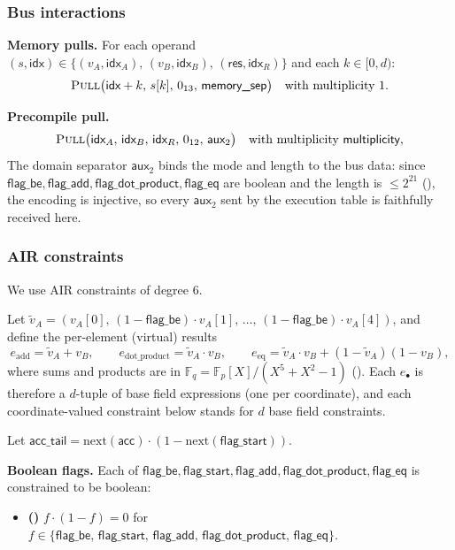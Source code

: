 \documentclass{article}
\theoremstyle{definition}
\newcommand{\Fp}{\mathbb F_p}
\newcommand{\Fq}{\mathbb F_q}
\newcommand{\extdeg}{d} %
\begin{document}
\subsubsection{Bus interactions}

\textbf{Memory pulls.} For each operand $(s, \textsf{idx}) \in \{(v_A, \textsf{idx}_A),\, (v_B, \textsf{idx}_B),\, (\textsf{res}, \textsf{idx}_R)\}$ and each $k \in [0, \extdeg)$:
\[
\textsc{Pull}\big(\textsf{idx} + k,\, s[k],\, 0_{13},\, \textsf{memory\_sep}\big) \quad \text{with multiplicity } 1.
\]

\textbf{Precompile pull.}
\[
\textsc{Pull}\big(\textsf{idx}_A,\, \textsf{idx}_B,\, \textsf{idx}_R,\, 0_{12},\, \textsf{aux}_2\big) \quad \text{with multiplicity } \textsf{multiplicity},
\]
The domain separator $\textsf{aux}_2$ binds the mode and length to the bus data: since $\textsf{flag\_be}, \textsf{flag\_add}, \textsf{flag\_dot\_product}, \textsf{flag\_eq}$ are boolean and the length is $\leq 2^{21}$ (), the encoding is injective, so every $\textsf{aux}_2$ sent by the execution table is faithfully received here.


\subsubsection{AIR constraints}

We use AIR constraints of degree 6.

\vspace{2mm}

Let $\tilde v_A = (v_A[0],\, (1 - \textsf{flag\_be}) \cdot v_A[1],\, \dots,\, (1 - \textsf{flag\_be}) \cdot v_A[4])$, and define the per-element (virtual) results
\[
    e_\text{add} = \tilde v_A + v_B, \qquad e_\text{dot\_product} = \tilde v_A \cdot v_B, \qquad e_\text{eq} = \tilde v_A \cdot v_B + (1 - \tilde v_A)(1 - v_B),
\]
where sums and products are in $\Fq = \Fp[X]/(X^5 + X^2 - 1)$ (). Each $e_\bullet$ is therefore a $\extdeg$-tuple of base field expressions (one per coordinate), and each coordinate-valued constraint below stands for $\extdeg$ base field constraints.

Let $\textsf{acc\_tail} = \text{next}(\textsf{acc}) \cdot (1 - \text{next}(\textsf{flag\_start}))$.

\vspace{2mm}

\textbf{Boolean flags.} Each of $\textsf{flag\_be}, \textsf{flag\_start}, \textsf{flag\_add}, \textsf{flag\_dot\_product}, \textsf{flag\_eq}$ is constrained to be boolean:
\begin{itemize}
    \item {}\textbf{(\theequation)}\label{c:bool-flags}\hspace{1mm} $f \cdot (1 - f) = 0$ for $f \in \{\textsf{flag\_be},\, \textsf{flag\_start},\, \textsf{flag\_add},\, \textsf{flag\_dot\_product},\, \textsf{flag\_eq}\}$.
\end{itemize}
\end{document}
